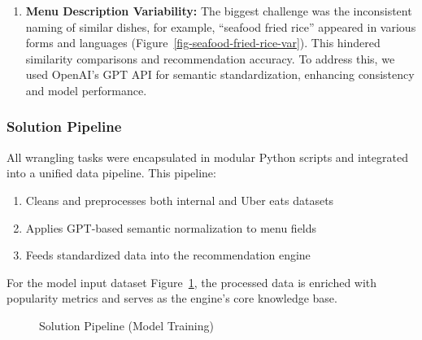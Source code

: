 \documentclass[
  11pt,
  a4paper,
  DIV=11,
  numbers=noendperiod]{scrartcl}
\providecommand{\tightlist}{%
  \setlength{\itemsep}{0pt}\setlength{\parskip}{0pt}}\usepackage{longtable,booktabs,array}
\begin{document}
\begin{enumerate}
\def\labelenumi{\arabic{enumi}.}
\setcounter{enumi}{2}
\tightlist
\item
  \textbf{Menu Description Variability:} The biggest challenge was the
  inconsistent naming of similar dishes, for example, ``seafood fried
  rice'' appeared in various forms and languages
  (Figure~\ref{fig-seafood-fried-rice-var}). This hindered similarity
  comparisons and recommendation accuracy. To address this, we used
  OpenAI's GPT API for semantic standardization, enhancing consistency
  and model performance.
\end{enumerate}

\subsubsection{Solution Pipeline}\label{solution-pipeline}

All wrangling tasks were encapsulated in modular Python scripts and
integrated into a unified data pipeline. This pipeline:

\begin{enumerate}
\def\labelenumi{\arabic{enumi}.}
\tightlist
\item
  Cleans and preprocesses both internal and Uber eats datasets
\item
  Applies GPT-based semantic normalization to menu fields
\item
  Feeds standardized data into the recommendation engine
\end{enumerate}

For the model input dataset Figure~\ref{fig-training-pipline}, the
processed data is enriched with popularity metrics and serves as the
engine's core knowledge base.

\begin{figure}

\caption{\label{fig-training-pipline}Solution Pipeline (Model Training)}


\end{figure}%
\end{document}
